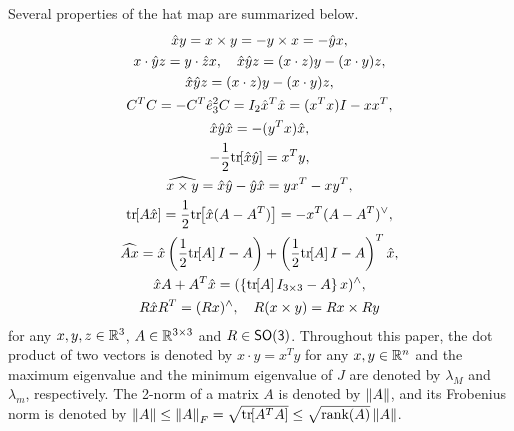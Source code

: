 Several properties of the hat map are summarized below.
\begin{gather}
   \hat x y = x\times y = - y\times x = - \hat y x, \label{eqn:cross_product}\\
    x\cdot \hat y z = y\cdot \hat z x,\quad \hat x\hat y z = (x\cdot z) y - (x\cdot y ) z\label{eqn:STP},\\
   \hat x\hat y z = (x\cdot z) y - (x\cdot y ) z,\label{eqn:VTP}\\
   C^TC=-C^T\hat e_3^2 C = I_2
   \hat x^T \hat x = (x^T x) I - x x^T,\\
   \hat x \hat y \hat x=-(y^Tx)\hat x,\\
   -\frac{1}{2}\mathrm{tr}\negthickspace\left[ \hat x \hat y \right] = x^T y,\\
    \widehat{x\times y} = \hat x \hat y -\hat y \hat x = yx^T-xy^T,\label{eqn:hatxy}\\
    \mathrm{tr}\negthickspace\left[ A\hat x  \right]=\frac{1}{2}\mathrm{tr}\negthickspace\left[ \hat x (A-A^T) \right]=-x^T (A-A^T)^\vee,\label{eqn:hat1}\\
   \widehat{Ax} = \hat x \left( \frac{1}{2}\mathrm{tr}\negthickspace\left[ A \right]I-A \right) + \left( \frac{1}{2}\mathrm{tr}\negthickspace\left[ A \right]I-A \right)^T \hat x,\\
    \hat x  A+A^T\hat x=(\left\{ \mathrm{tr}\negthickspace\left[ A \right]I_{3\times 3}-A \right\}x)^{\wedge}, \label{eqn:xAAx} \\
    R\hat x R^T = (Rx)^\wedge,\quad 
    R(x\times y) = Rx\times Ry\label{eqn:RxR}
\end{gather}
for any $x,y,z\in\mathbb{R}^{3}$, $A\in\mathbb{R}^{3\times 3}$ and $R\in\mathsf{SO(3)}$. 
Throughout this paper, the dot product of two vectors is denoted by $x\cdot y = x^T y$ for any $x,y\in\mathbb{R}^n$ and the maximum eigenvalue and the minimum eigenvalue of $J$ are denoted by $\lambda_M$ and $\lambda_m$, respectively. 
The 2-norm of a matrix \( A \) is denoted by \( \left\| A \right\| \), and its Frobenius norm is denoted by \( \left\| A \right\| \leq \left\| A \right\|_F = \sqrt{\mathrm{tr}\negthickspace\left[ A^T A \right]} \leq \sqrt{\text{rank}(A)} \left\| A \right\| \).
